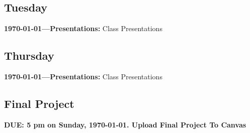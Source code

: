 \subsection{Tuesday} \textbf{\today---Presentations:} Class Presentations
\AdvanceDate[2]

\subsection{Thursday } \textbf{\today---Presentations:} Class Presentations

\AdvanceDate[3]

\vspace{2em}

\subsection{Final Project} \textbf{DUE: 5 pm on Sunday, \today. Upload Final Project To Canvas}

\vspace{2em}










